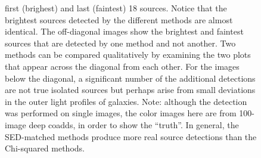 \documentclass[11pt,letterpaper,linenumbers]{aastex7}
\begin{document}
\begin{figure}[p!]
{    first (brighest) and last (faintest) 18 sources.  Notice that the brightest
    sources detected by the different methods are almost identical.  The
    off-diagonal images show the brightest and faintest sources that are detected
    by one method and not another.  Two methods can be compared qualitatively
    by examining the two plots that appear across the diagonal from each other.
    For the images below the diagonal, a significant number of the additional
    detections are not true isolated sources but perhaps arise from small
    deviations in the outer light profiles of galaxies.
    Note: although the detection was performed on single images, the color images
    here are from 100-image deep coadds, in order to show the ``truth''.
    In general, the SED-matched methods produce more real source detections
    than the Chi-squared methods.
    \label{fig:comp-images}
    }
\end{figure}
\end{document}
